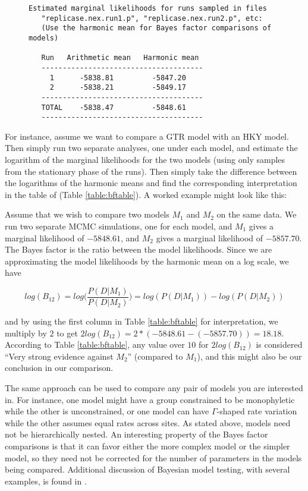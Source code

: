 \documentclass[12pt]{book}
\begin{document}
\begin{figure}[h]
\centering
\begin{BVerbatim}
Estimated marginal likelihoods for runs sampled in files
   "replicase.nex.run1.p", "replicase.nex.run2.p", etc:
   (Use the harmonic mean for Bayes factor comparisons of models)

   Run   Arithmetic mean   Harmonic mean
   --------------------------------------
     1      -5838.81         -5847.20
     2      -5838.21         -5849.17
   --------------------------------------
   TOTAL    -5838.47         -5848.61
   --------------------------------------
\end{BVerbatim}
\end{figure}

For instance, assume we want to compare a GTR model with an HKY model. Then simply run two separate
analyses, one under each model, and estimate the logarithm of the marginal likelihoods for the two
models (using only samples from the stationary phase of the runs). Then simply take the difference
between the logarithms of the harmonic means and find the corresponding interpretation in the table
of \citet{kass95} (Table \ref{table:bftable}). A worked example might look like this:

Assume that we wish to compare two models $M_{1}$ and $M_{2}$ on the same data. We run two separate
MCMC simulations, one for each model, and $M_{1}$ gives a marginal likelihood of $-5848.61$, and
$M_{2}$ gives a marginal likelihood of $-5857.70$.  The Bayes factor is the ratio between the model
likelihoods. Since we are approximating the model likelihoods by the harmonic mean on a log scale,
we have 

$$
log (B_{12}) =
log \Big(\frac{P(D|M_{1})}{P(D|M_{2})}\Big) = log(P(D|M_{1})) - log(P(D|M_{2}))
$$

and by using the first column in Table \ref{table:bftable} for interpretation, we multiply by $2$
to get $2 log(B_{12}) = 2 * (-5848.61 - (-5857.70)) = 18.18$. According to Table
\ref{table:bftable}, any value over $10$ for $2 log(B_{12})$ is considered ``Very strong evidence
against $M_{2}$'' (compared to $M_{1}$), and this might also be our conclusion in our comparison.

The same approach can be used to compare any pair of models you are interested in. For instance,
one model might have a group constrained to be monophyletic while the other is unconstrained, or
one model can have $\Gamma$-shaped rate variation while the other assumes equal rates across sites.
As stated above, models need not be hierarchically nested.  An interesting property of the Bayes
factor comparisons is that it can favor either the more complex model or the simpler model, so they
need not be corrected for the number of parameters in the models being compared. Additional
discussion of Bayesian model testing, with several examples, is found in \citet{nylander04}.
\end{document}
